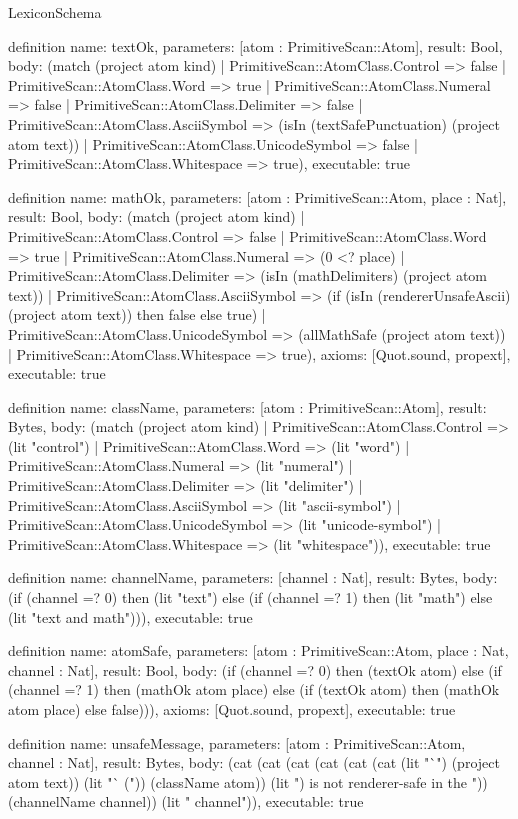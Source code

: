 \begin{lexlean}{LexiconSchema}
\begin{semanticmodule}
definition{
  name: textOk,
  parameters: [atom : PrimitiveScan::Atom],
  result: Bool,
  body: (match (project atom kind)
    | PrimitiveScan::AtomClass.Control => false
    | PrimitiveScan::AtomClass.Word => true
    | PrimitiveScan::AtomClass.Numeral => false
    | PrimitiveScan::AtomClass.Delimiter => false
    | PrimitiveScan::AtomClass.AsciiSymbol => (isIn (textSafePunctuation) (project atom text))
    | PrimitiveScan::AtomClass.UnicodeSymbol => false
    | PrimitiveScan::AtomClass.Whitespace => true),
  executable: true
}

definition{
  name: mathOk,
  parameters: [atom : PrimitiveScan::Atom, place : Nat],
  result: Bool,
  body: (match (project atom kind)
    | PrimitiveScan::AtomClass.Control => false
    | PrimitiveScan::AtomClass.Word => true
    | PrimitiveScan::AtomClass.Numeral => (0 <? place)
    | PrimitiveScan::AtomClass.Delimiter => (isIn (mathDelimiters) (project atom text))
    | PrimitiveScan::AtomClass.AsciiSymbol => (if (isIn (rendererUnsafeAscii) (project atom text)) then false else true)
    | PrimitiveScan::AtomClass.UnicodeSymbol => (allMathSafe (project atom text))
    | PrimitiveScan::AtomClass.Whitespace => true),
  axioms: [Quot.sound, propext],
  executable: true
}

definition{
  name: className,
  parameters: [atom : PrimitiveScan::Atom],
  result: Bytes,
  body: (match (project atom kind)
    | PrimitiveScan::AtomClass.Control => (lit "control")
    | PrimitiveScan::AtomClass.Word => (lit "word")
    | PrimitiveScan::AtomClass.Numeral => (lit "numeral")
    | PrimitiveScan::AtomClass.Delimiter => (lit "delimiter")
    | PrimitiveScan::AtomClass.AsciiSymbol => (lit "ascii-symbol")
    | PrimitiveScan::AtomClass.UnicodeSymbol => (lit "unicode-symbol")
    | PrimitiveScan::AtomClass.Whitespace => (lit "whitespace")),
  executable: true
}

definition{
  name: channelName,
  parameters: [channel : Nat],
  result: Bytes,
  body: (if (channel =? 0) then (lit "text") else (if (channel =? 1) then (lit "math") else (lit "text and math"))),
  executable: true
}

definition{
  name: atomSafe,
  parameters: [atom : PrimitiveScan::Atom, place : Nat, channel : Nat],
  result: Bool,
  body: (if (channel =? 0) then (textOk atom) else (if (channel =? 1) then (mathOk atom place) else (if (textOk atom) then (mathOk atom place) else false))),
  axioms: [Quot.sound, propext],
  executable: true
}

definition{
  name: unsafeMessage,
  parameters: [atom : PrimitiveScan::Atom, channel : Nat],
  result: Bytes,
  body: (cat (cat (cat (cat (cat (cat (lit "`") (project atom text)) (lit "` (")) (className atom)) (lit ") is not renderer-safe in the ")) (channelName channel)) (lit " channel")),
  executable: true
}


\end{semanticmodule}
\end{lexlean}
